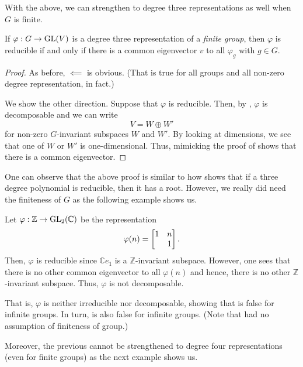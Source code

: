 With the above, we can strengthen  to degree three representations as well when $G$ is finite.
\begin{prop} \label{prop:deg3repirreducible}
	If $\varphi:G\to \operatorname{GL}(V)$ is a degree three representation of a \emph{finite group}, then $\varphi$ is reducible if and only if there is a common eigenvector $v$ to all $\varphi_g$ with $g \in G.$
\end{prop}
\begin{proof} 
	As before, $\impliedby$ is obvious. (That is true for all groups and all non-zero degree representation, in fact.)

	We show the other direction. Suppose that $\varphi$ is reducible. Then, by , $\varphi$ is decomposable and we can write
	\begin{equation*} 
		V = W \oplus W'
	\end{equation*}
	for non-zero $G$-invariant subspaces $W$ and $W'.$ By looking at dimensions, we see that one of $W$ or $W'$ is one-dimensional. Thus, mimicking the proof of  shows that there is a common eigenvector.
\end{proof}
One can observe that the above proof is similar to how shows that if a three degree polynomial is reducible, then it has a root. However, we really did need the finiteness of $G$ as the following example shows us.

\begin{ex} \label{ex:Zredbutnotdecomposable}
	Let $\varphi:\mathbb{Z} \to \operatorname{GL}_2(\mathbb{C})$ be the representation
	\begin{equation*} 
		\varphi(n) = \begin{bmatrix} 1 & n \\  & 1 \end{bmatrix}.
	\end{equation*}
	Then, $\varphi$ is reducible since $\mathbb{C}e_1$ is a $\mathbb{Z}$-invariant subspace. However, one sees that there is no other common eigenvector to all $\varphi(n)$ and hence, there is no other $\mathbb{Z}$-invariant subspace. Thus, $\varphi$ is not decomposable.

	That is, $\varphi$ is neither irreducible nor decomposable, showing that  is false for infinite groups. In turn,  is also false for infinite groups. (Note that  had no  assumption of finiteness of group.)
\end{ex}

Moreover, the previous cannot be strengthened to degree four representations (even for finite groups) as the next example shows us.

